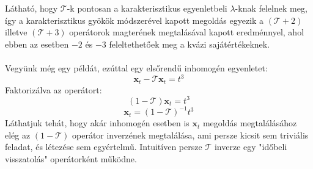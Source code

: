 \documentclass[14p]{article}
\begin{document}
Látható, hogy $\mathcal{T}$-k pontosan a karakterisztikus egyenletbeli $\lambda$-knak felelnek meg, így a karakterisztikus gyökök módszerével kapott megoldás egyezik a $(\mathcal{T}+2)$ illetve $(\mathcal{T}+3)$ operátorok magterének megtalásával kapott eredménnyel, ahol ebben az esetben $-2$ és $-3$ feleltethetőek meg a kvázi sajátértékeknek.
\\
\\
Vegyünk még egy példát, ezúttal egy elsőrendű inhomogén egyenletet:
\[
	\pmb{x}_t - \mathcal{T}\pmb{x}_t = t^3
\]
Faktorizálva az operátort:
\[
	(1-\mathcal{T})\pmb{x}_t = t^3
\]
\[
	\pmb{x}_t = (1-\mathcal{T})^{-1}t^3
\]
Láthatjuk tehát, hogy akár inhomogén esetben is $\pmb{x}_t$ megoldás megtalálásához elég az $(1-\mathcal{T})$ operátor inverzének megtalálása, ami persze kicsit sem triviális feladat, és létezése sem egyértelmű. Intuitíven persze $\mathcal{T}$ inverze egy "időbeli visszatolás" operátorként működne.
\end{document}
